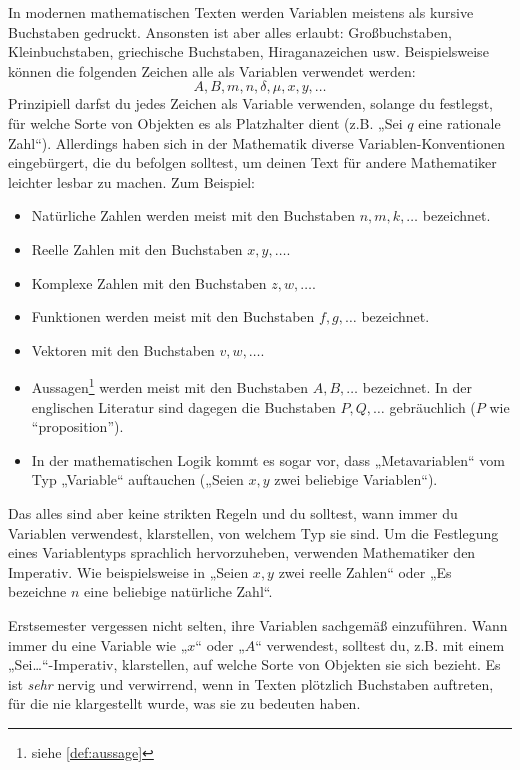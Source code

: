 \begin{nota}
    In modernen mathematischen Texten werden Variablen meistens als kursive Buchstaben gedruckt. Ansonsten ist aber alles erlaubt: Großbuchstaben, Kleinbuchstaben, griechische Buchstaben, Hiraganazeichen usw. Beispielsweise können die folgenden Zeichen alle als Variablen verwendet werden:
        \[ A,B,m,n,\delta,\mu, x,y,\dots \]
    Prinzipiell darfst du jedes Zeichen als Variable verwenden, solange du festlegst, für welche Sorte von Objekten es als Platzhalter dient (z.B. „Sei $q$ eine rationale Zahl“). Allerdings haben sich in der Mathematik diverse Variablen-Konventionen eingebürgert, die du befolgen solltest, um deinen Text für andere Mathematiker leichter lesbar zu machen. Zum Beispiel:
    \begin{itemize}
        \item Natürliche Zahlen werden meist mit den Buchstaben $n,m,k,\dots$ bezeichnet.
        \item Reelle Zahlen mit den Buchstaben $x,y,\dots$.
        \item Komplexe Zahlen mit den Buchstaben $z,w,\dots$.
        \item Funktionen werden meist mit den Buchstaben $f,g,\dots$ bezeichnet.
        \item Vektoren mit den Buchstaben $v,w,\dots$.
        \item Aussagen\footnote{siehe \cref{def:aussage}} werden meist mit den Buchstaben $A,B,\dots$ bezeichnet. In der englischen Literatur sind dagegen die Buchstaben $P,Q,\dots$ gebräuchlich ($P$ wie ``proposition'').
        \item In der mathematischen Logik kommt es sogar vor, dass „Metavariablen“ vom Typ „Variable“ auftauchen („Seien $x,y$ zwei beliebige Variablen“).
    \end{itemize}
    Das alles sind aber keine strikten Regeln und du solltest, wann immer du Variablen verwendest, klarstellen, von welchem Typ sie sind. Um die Festlegung eines Variablentyps sprachlich hervorzuheben, verwenden Mathematiker den Imperativ. Wie beispielsweise in „Seien $x,y$ zwei reelle Zahlen“ oder „Es bezeichne $n$ eine beliebige natürliche Zahl“.
\end{nota}


\begin{bem}
    Erstsemester vergessen nicht selten, ihre Variablen sachgemäß einzuführen. Wann immer du eine Variable wie „$x$“ oder „$A$“ verwendest, solltest du, z.B. mit einem „Sei\dots“-Imperativ, klarstellen, auf welche Sorte von Objekten sie sich bezieht. Es ist \emph{sehr} nervig und verwirrend, wenn in Texten plötzlich Buchstaben auftreten, für die nie klargestellt wurde, was sie zu bedeuten haben. 
\end{bem}


